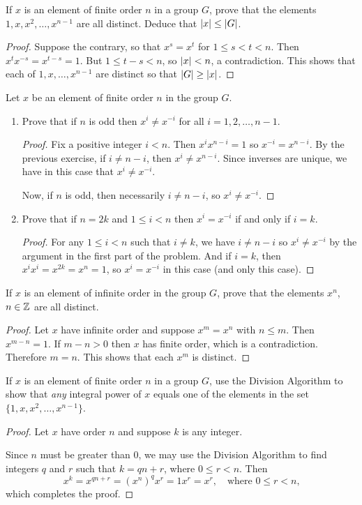  If $x$ is an element of finite order $n$ in a group $G$,
prove that the elements $1, x, x^2, \dots, x^{n-1}$ are all
distinct. Deduce that $\lvert{x}\rvert\leq\lvert{G}\rvert$.
\begin{proof}
  Suppose the contrary, so that $x^s = x^t$ for $1\leq s < t<n$. Then
  $x^tx^{-s} = x^{t-s} = 1$. But $1\leq t-s < n$, so $\lvert{x}\rvert < n$, a
  contradiction. This shows that each of $1, x,\dots,x^{n-1}$ are
  distinct so that $\lvert{G}\rvert\geq\lvert{x}\rvert$.
\end{proof}

 Let $x$ be an element of finite order $n$ in the group
$G$.
\begin{enumerate}
\item Prove that if $n$ is odd then $x^i\neq x^{-i}$ for all
  $i = 1, 2, \dots, n-1$.
  \begin{proof}
    Fix a positive integer $i < n$. Then $x^ix^{n-i} = 1$ so
    $x^{-i} = x^{n-i}$. By the previous exercise, if $i\neq n-i$, then
    $x^i\neq x^{n-i}$. Since inverses are unique, we have in this case
    that $x^i\neq x^{-i}$.

    Now, if $n$ is odd, then necessarily $i\neq n-i$, so
    $x^i\neq x^{-i}$.
  \end{proof}
\item Prove that if $n = 2k$ and $1\leq i < n$ then $x^i = x^{-i}$ if
  and only if $i = k$.
  \begin{proof}
    For any $1\leq i<n$ such that $i\neq k$, we have $i\neq n-i$ so
    $x^i\neq x^{-i}$ by the argument in the first part of the
    problem. And if $i = k$, then $x^ix^i = x^{2k} = x^n = 1$, so
    $x^i = x^{-i}$ in this case (and only this case).
  \end{proof}
\end{enumerate}

 If $x$ is an element of infinite order in the group $G$,
prove that the elements $x^n$, $n\in\mathbb{Z}$ are all distinct.
\begin{proof}
  Let $x$ have infinite order and suppose $x^m = x^n$ with $n\leq
  m$. Then $x^{m-n} = 1$. If $m-n > 0$ then $x$ has finite order,
  which is a contradiction. Therefore $m = n$. This shows that each
  $x^m$ is distinct.
\end{proof}

 If $x$ is an element of finite order $n$ in a group $G$,
use the Division Algorithm to show that {\em any} integral power of
$x$ equals one of the elements in the set $\{1,x,x^2,\dots,x^{n-1}\}$.
\begin{proof}
  Let $x$ have order $n$ and suppose $k$ is any integer.

  Since $n$ must be greater than $0$, we may use the Division
  Algorithm to find integers $q$ and $r$ such that $k = qn + r$, where
  $0\leq r<n$. Then
  \begin{equation*}
    x^k = x^{qn+r} = (x^n)^qx^r = 1x^r = x^r,
    \quad \text{where $0\leq r<n$,}
  \end{equation*}
  which completes the proof.
\end{proof}

